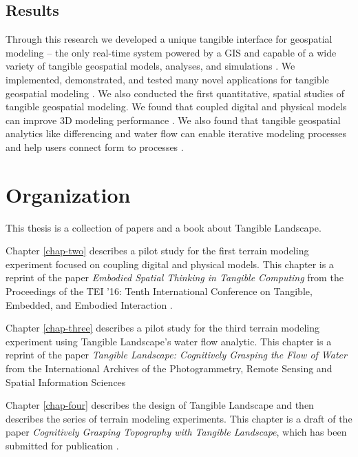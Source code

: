 \subsection{Results}
Through this research we developed
 a unique tangible interface for geospatial modeling
-- the only real-time system 
powered by a GIS
and capable of a wide variety of 
tangible geospatial models, analyses, and simulations 
\cite{Petrasova2014,Petrasova2015,Harmon2016c}. 
%
We implemented, demonstrated, and tested many novel applications 
for tangible geospatial modeling 
\cite{Petrasova2014,Petrasova2015,Harmon2016c,Petrasova2016}. 
%
We also conducted the first quantitative, spatial studies 
of tangible geospatial modeling.
%
We found that 
coupled digital and physical models 
can improve 3D modeling performance
\cite{Harmon2016b,Harmon2016c}.
%
We also found that tangible geospatial analytics 
like differencing and water flow
can enable iterative modeling processes \cite{Harmon2016c}
and help users connect form to processes
\cite{Harmon2016,Harmon2016c}.


\section{Organization}

This thesis is a collection of papers and a book about Tangible Landscape.

Chapter \ref{chap-two} 
describes a pilot study for the first terrain modeling experiment 
focused on coupling digital and physical models.
This chapter is a reprint of the paper 
\emph{Embodied Spatial Thinking in Tangible Computing}
from the Proceedings of the TEI '16: 
Tenth International Conference on Tangible, Embedded, and Embodied Interaction
\cite{Harmon2016b}.

Chapter \ref{chap-three} 
describes a pilot study for the third terrain modeling experiment
using Tangible Landscape's water flow analytic. 
This chapter is a reprint of the paper 
\emph{Tangible Landscape: Cognitively Grasping the Flow of Water}
from the International Archives of the Photogrammetry, Remote Sensing and Spatial Information Sciences
\cite{Harmon2016}

Chapter \ref{chap-four}
describes the design of Tangible Landscape 
and then describes the series of terrain modeling experiments. 
This chapter is a draft of the paper 
\emph{Cognitively Grasping Topography with Tangible Landscape},
which has been submitted for publication \cite{Harmon2016c}.

